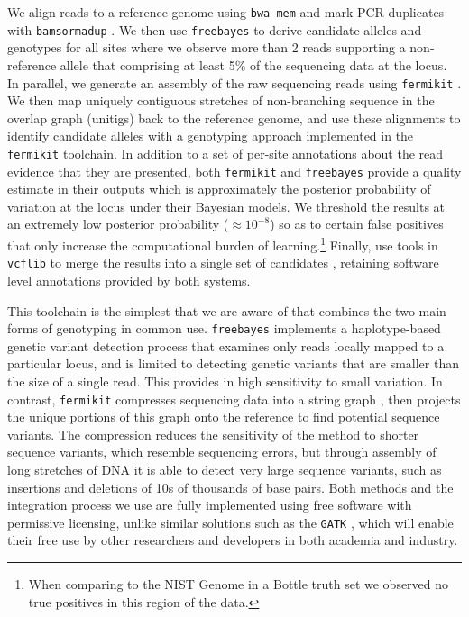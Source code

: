 \documentclass{article}
\begin{document}
We align reads to a reference genome using {\tt bwa mem} \cite{li2013bwamem} and mark PCR duplicates with {\tt bamsormadup} \cite{tischler2014biobambam}.
We then use {\tt freebayes} \cite{garrison2012haplotype} to derive candidate alleles and genotypes for all sites where we observe more than 2 reads supporting a non-reference allele that comprising at least 5\% of the sequencing data at the locus.
In parallel, we generate an assembly of the raw sequencing reads using {\tt fermikit} \cite{li2015fermikit}.
We then map uniquely contiguous stretches of non-branching sequence in the overlap graph (unitigs) back to the reference genome, and use these alignments to identify candidate alleles with a genotyping approach implemented in the {\tt fermikit} toolchain.
In addition to a set of per-site annotations about the read evidence that they are presented, both {\tt fermikit} and {\tt freebayes} provide a quality estimate in their outputs which is approximately the posterior probability of variation at the locus under their Bayesian models.
We threshold the results at an extremely low posterior probability ($\approx 10^{-8}$) so as to certain false positives that only increase the computational burden of learning.\footnote{When comparing to the NIST Genome in a Bottle truth set we observed no true positives in this region of the data.}
Finally, use tools in {\tt vcflib} to merge the results into a single set of candidates \cite{vcflibgit}, retaining software level annotations provided by both systems.

This toolchain is the simplest that we are aware of that combines the two main forms of genotyping in common use.
{\tt freebayes} implements a haplotype-based genetic variant detection process that examines only reads locally mapped to a particular locus, and is limited to detecting genetic variants that are smaller than the size of a single read.
This provides in high sensitivity to small variation.
In contrast, {\tt fermikit} compresses sequencing data into a string graph \cite{myers2005}, then projects the unique portions of this graph onto the reference to find potential sequence variants.
The compression reduces the sensitivity of the method to shorter sequence variants, which resemble sequencing errors, but through assembly of long stretches of DNA it is able to detect very large sequence variants, such as insertions and deletions of 10s of thousands of base pairs.
Both methods and the integration process we use are fully implemented using free software with permissive licensing, unlike similar solutions such as the {\tt GATK} \cite{gatk2011}, which will enable their free use by other researchers and developers in both academia and industry.
\end{document}
